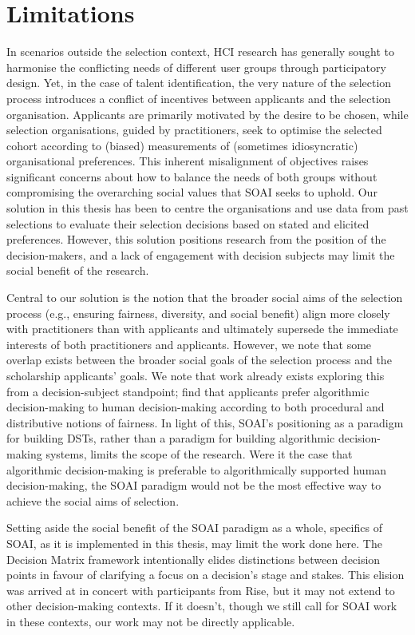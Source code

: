\section{Limitations}
In scenarios outside the selection context, HCI research has generally sought to harmonise the conflicting needs of different user groups through participatory design. Yet, in the case of talent identification, the very nature of the selection process introduces a conflict of incentives between applicants and the selection organisation. Applicants are primarily motivated by the desire to be chosen, while selection organisations, guided by practitioners, seek to optimise the selected cohort according to (biased) measurements of (sometimes idiosyncratic) organisational preferences. This inherent misalignment of objectives raises significant concerns about how to balance the needs of both groups without compromising the overarching social values that SOAI seeks to uphold. Our solution in this thesis has been to centre the organisations and use data from past selections to evaluate their selection decisions based on stated and elicited preferences. However, this solution positions research from the position of the decision-makers, and a lack of engagement with decision subjects may limit the social benefit of the research.

Central to our solution is the notion that the broader social aims of the selection process (e.g., ensuring fairness, diversity, and social benefit) align more closely with practitioners than with applicants and ultimately supersede the immediate interests of both practitioners and applicants. However, we note that some overlap exists between the broader social goals of the selection process and the scholarship applicants' goals. We note that work already exists exploring this from a decision-subject standpoint; \textcite{10.1145/3351095.3372867} find that applicants prefer algorithmic decision-making to human decision-making according to both procedural and distributive notions of fairness. In light of this, SOAI's positioning as a paradigm for building DSTs, rather than a paradigm for building algorithmic decision-making systems, limits the scope of the research. Were it the case that algorithmic decision-making is preferable to algorithmically supported human decision-making, the SOAI paradigm would not be the most effective way to achieve the social aims of selection.

Setting aside the social benefit of the SOAI paradigm as a whole, specifics of SOAI, as it is implemented in this thesis, may limit the work done here. The Decision Matrix framework intentionally elides distinctions between decision points in favour of clarifying a focus on a decision's stage and stakes. This elision was arrived at in concert with participants from Rise, but it may not extend to other decision-making contexts. If it doesn't, though we still call for SOAI work in these contexts, our work may not be directly applicable.

